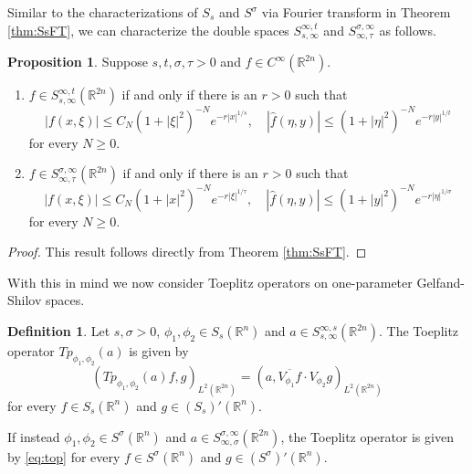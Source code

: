 \documentclass[11pt,a4paper,reqno]{amsart}
\numberwithin{equation}{section}
\theoremstyle{definition}
\newtheorem{prop}[thm]{Proposition}
\theoremstyle{definition}
\newtheorem{definition}[thm]{Definition}
\begin{document}
    Similar to the characterizations of $S_s$ and $S^\sigma$ via Fourier transform in Theorem \ref{thm:SsFT}, we can characterize the double spaces $S_{s,\infty}^{\infty,t}$ and $S_{\infty,\tau}^{\sigma,\infty}$ as follows.
    
    \begin{prop}\label{prop:doublespace}
    Suppose $s,t,\sigma,\tau>0$ and $f\in C^{\infty}(\mathbb{R}^{2 n})$. 
    \begin{enumerate}[label=(\alph*)]
        \item $f\in S_{s,\infty}^{\infty,t}(\mathbb{R}^{2 n})$ if and only if there is an $r>0$ such that
        \begin{equation}
            |f(x,\xi)|\leq C_N (1+|\xi|^2)^{-N} e^{-r |x|^{1/s}}, \quad |\hat{f}(\eta,y)|\leq (1+|\eta|^2)^{-N} e^{- r|y|^{1/t}}
        \end{equation}
        for every $N\geq 0$.
        \item $f\in S_{\infty,\tau}^{\sigma,\infty}(\mathbb{R}^{2 n})$ if and only if there is an $r>0$ such that
        \begin{equation}
            |f(x,\xi)|\leq C_N (1+|x|^2)^{-N} e^{-r |\xi|^{1/\tau}}, \quad |\hat{f}(\eta,y)|\leq (1+|y|^2)^{-N} e^{- r|\eta|^{1/\sigma}}
        \end{equation}
        for every $N\geq 0$.
    \end{enumerate}
    \end{prop}
    \begin{proof}
    This result follows directly from Theorem \ref{thm:SsFT}.
    \end{proof}
    With this in mind we now consider Toeplitz operators on one-parameter Gelfand-Shilov spaces.
    \begin{definition}\label{def:top}
    Let $s,\sigma>0$, $\phi_1,\phi_2 \in S_s(\mathbb{R}^n)$ and $a\in S_{s,\infty}^{\infty,s}(\mathbb{R}^{2 n})$. 
    The Toeplitz operator $Tp_{\phi_1,\phi_2}(a)$ is given by
     \begin{equation}\label{eq:top}
         (Tp_{\phi_1,\phi_2}(a) f, g)_{L^2(\mathbb{R}^{2 n})} = (a, \overline{V_{\phi_1} f}\cdot V_{\phi_2} g)_{L^2(\mathbb{R}^{2 n})}
     \end{equation}
     for every $f\in S_s(\mathbb{R}^n)$ and $g\in (S_s)'(\mathbb{R}^n)$.
     
     If instead $\phi_1,\phi_2\in S^\sigma(\mathbb{R}^n)$ and $a\in S^{\sigma,\infty}_{\infty,\sigma}(\mathbb{R}^{2 n})$, the Toeplitz operator is given by \eqref{eq:top} for every $f\in S^\sigma(\mathbb{R}^n)$ and $g\in (S^\sigma)'(\mathbb{R}^n)$.
    \end{definition}
\end{document}
